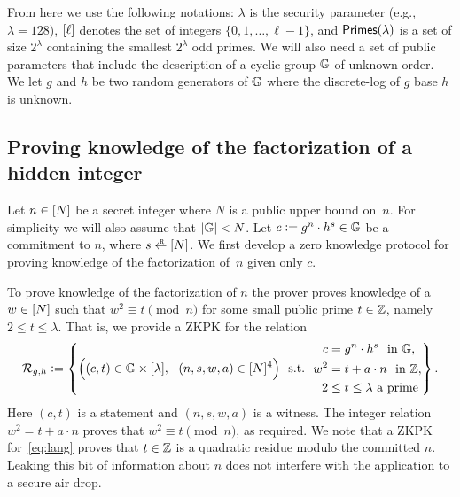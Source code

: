 \documentclass[11pt]{article}
\begin{document}
From here we use the following notations:
$\lambda$ is the security parameter (e.g., $\lambda = 128$), 
$[{\ell}]$ denotes the set of integers $\{0,1,\ldots,\ell-1\}$, and 
$\textsf{Primes}(\lambda)$ is a set of size $2^\lambda$ 
containing the smallest $2^\lambda$ odd primes. 
%
We will also need a set of public parameters that include the description
of a cyclic group $\mathbb G$ of unknown order.  We let $g$ and $h$ be two
random generators of $\mathbb G$ where the discrete-log of $g$ base $h$ is unknown. 

\subsection{Proving knowledge of the factorization of a hidden integer}

Let $n \in [{N}]$ be a secret integer 
where $N$ is a public upper bound on~$n$.
For simplicity we will also assume that $\lvert \mathbb G \rvert < N$.
Let $c \mathrel{\mathop:}= g^n \cdot h^s \in \mathbb G$ be a commitment to $n$, 
where $s \rgets \range{N}$.  
We first develop a zero knowledge protocol for proving knowledge of the
factorization of~$n$ given only $c$. 


To prove knowledge of the factorization of $n$ the prover
proves knowledge of a $w \in [{N}]$ such that $w^2 \equiv t \pmod{n}$
for some small public prime $t \in \mathbb Z$, namely $2 \leq t \leq \lambda$.
That is, we provide a ZKPK for the relation
\begin{equation} \label{eq:lang}
  {\cal R}_{g,h} \deq \left\{ \Bigl( (c, t) \in \GG \times \range{\lambda},\ \ 
                              (n, s, w, a) \in \range{N}^4 \Bigr)  \ \ 
        \text{s.t.}\ \ 
                \begin{split}
                        c   & = g^n \cdot h^s \ \ \text{in $\GG$}, \\
                        w^2 & = t + a \cdot n \ \ \text{in $\ZZ$}, \\
                        2 & \leq t \leq \lambda  \ \textrm{a prime}
                \end{split}  \right\}.
\end{equation}
Here $(c, t)$ is a statement and $(n, s, w, a)$ is a witness.
The integer relation $w^2 = t + a\cdot n$ proves that 
$w^2 \equiv t \pmod{n}$, as required.
We note that a ZKPK for~\eqref{eq:lang} proves that $t \in \mathbb Z$ is a quadratic
residue modulo the committed $n$.  Leaking this bit of information about $n$
does not interfere with the application to a secure air drop.
\end{document}
